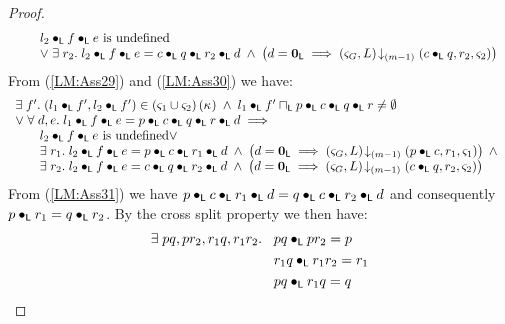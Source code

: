 \begin{lemma}[]
\begin{proof}
\begin{align}
\begin{array}{l}
		\hspace*{0.5cm}
		\begin{array}{l l}
			l_2 \bullet_{\textsf{L}} f \bullet_{\textsf{L}} e \text{ is undefined}\\
			\lor\; \exists\; r_2.\; l_2 \bullet_{\textsf{L}} f \bullet_{\textsf{L}} e = c \bullet_{\textsf{L}} q \bullet_{\textsf{L}} r_2 \bullet_{\textsf{L}} d \;\land\; \left( d = \mathbf{0}_{\textsf{L}} \implies \left(\varsigma_{G}, L\right) \!\downarrow_{(m-1)} \left(c \bullet_{\textsf{L}} q, r_2, \varsigma_{2}\right)\right)
		\end{array}
	\end{array} \label{LM:Ass30}
\end{align}
From (\ref{LM:Ass29}) and (\ref{LM:Ass30}) we have:
%
\begin{align}
	\begin{array}{l}
		\exists\; f'.\; (l_1 \bullet_{\textsf{L}} f', l_2 \bullet_{\textsf{L}} f') \in \left(\varsigma_{1} \cup \varsigma_{2}\right)(\kappa_{}) \;\land\; l_1 \bullet_{\textsf{L}} f' \sqcap_{\textsf{L}} p \bullet_{\textsf{L}} c \bullet_{\textsf{L}} q \bullet_{\textsf{L}} r \not= \emptyset\\
		\lor\;\forall\; d, e.\;  l_1 \bullet_{\textsf{L}} f \bullet_{\textsf{L}} e = p \bullet_{\textsf{L}} c \bullet_{\textsf{L}} q \bullet_{\textsf{L}} r \bullet_{\textsf{L}} d \implies\\
		\hspace*{0.5cm}
		\begin{array}{l l}
			l_2 \bullet_{\textsf{L}} f \bullet_{\textsf{L}} e \text{ is undefined} \lor\;\\
			\exists\; r_1.\; l_2 \bullet_{\textsf{L}} f \bullet_{\textsf{L}} e = p \bullet_{\textsf{L}} c \bullet_{\textsf{L}} r_1 \bullet_{\textsf{L}} d \;\land\; \left( d = \mathbf{0}_{\textsf{L}} \implies \left(\varsigma_{G}, L\right) \!\downarrow_{(m-1)} \left(p \bullet_{\textsf{L}} c, r_1, \varsigma_{1}\right) \right)\;\land\\
			\exists\; r_2.\; l_2 \bullet_{\textsf{L}} f \bullet_{\textsf{L}} e = c \bullet_{\textsf{L}} q \bullet_{\textsf{L}} r_2 \bullet_{\textsf{L}} d \;\land\; \left( d = \mathbf{0}_{\textsf{L}} \implies \left(\varsigma_{G}, L\right) \!\downarrow_{(m-1)} \left(c \bullet_{\textsf{L}} q, r_2, \varsigma_{2}\right)\right)
		\end{array}
	\end{array}
	\label{LM:Ass31}
\end{align}
From (\ref{LM:Ass31}) we have $p \bullet_{\textsf{L}} c \bullet_{\textsf{L}} r_1 \bullet_{\textsf{L}} d = q \bullet_{\textsf{L}} c \bullet_{\textsf{L}} r_2 \bullet_{\textsf{L}} d$ and consequently $p \bullet_{\textsf{L}} r_1 = q \bullet_{\textsf{L}} r_2$. By the cross split property we then have:
%
\begin{align}
	\exsts{pq, pr_2, r_1q, r_1r_2} \hspace*{0.2cm}& pq  \composeL pr_2 = p \label{LM:Ass32}\\
	& r_1q \composeL r_1r_2 = r_1 \label{LM:Ass33}\\
	& pq \composeL r_1q = q \label{LM:Ass34}\\

\end{align}
\end{proof}
\end{lemma}
